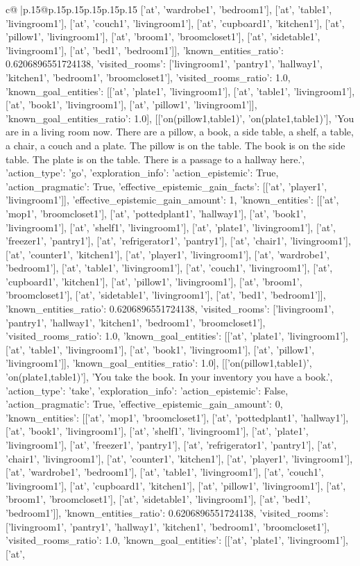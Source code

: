 \documentclass{article}
\begin{document}
{\begin{supertabular}{c@{$\;$}|p{.15\linewidth}@{}p{.15\linewidth}p{.15\linewidth}p{.15\linewidth}p{.15\linewidth}p{.15\linewidth}}
{{{['at', 'wardrobe1', 'bedroom1'], ['at', 'table1', 'livingroom1'], ['at', 'couch1', 'livingroom1'], ['at', 'cupboard1', 'kitchen1'], ['at', 'pillow1', 'livingroom1'], ['at', 'broom1', 'broomcloset1'], ['at', 'sidetable1', 'livingroom1'], ['at', 'bed1', 'bedroom1']], 'known_entities_ratio': 0.6206896551724138, 'visited_rooms': ['livingroom1', 'pantry1', 'hallway1', 'kitchen1', 'bedroom1', 'broomcloset1'], 'visited_rooms_ratio': 1.0, 'known_goal_entities': [['at', 'plate1', 'livingroom1'], ['at', 'table1', 'livingroom1'], ['at', 'book1', 'livingroom1'], ['at', 'pillow1', 'livingroom1']], 'known_goal_entities_ratio': 1.0}}], [['on(pillow1,table1)', 'on(plate1,table1)'], 'You are in a living room now. There are a pillow, a book, a side table, a shelf, a table, a chair, a couch and a plate. The pillow is on the table. The book is on the side table. The plate is on the table. There is a passage to a hallway here.', {'action_type': 'go', 'exploration_info': {'action_epistemic': True, 'action_pragmatic': True, 'effective_epistemic_gain_facts': [['at', 'player1', 'livingroom1']], 'effective_epistemic_gain_amount': 1, 'known_entities': [['at', 'mop1', 'broomcloset1'], ['at', 'pottedplant1', 'hallway1'], ['at', 'book1', 'livingroom1'], ['at', 'shelf1', 'livingroom1'], ['at', 'plate1', 'livingroom1'], ['at', 'freezer1', 'pantry1'], ['at', 'refrigerator1', 'pantry1'], ['at', 'chair1', 'livingroom1'], ['at', 'counter1', 'kitchen1'], ['at', 'player1', 'livingroom1'], ['at', 'wardrobe1', 'bedroom1'], ['at', 'table1', 'livingroom1'], ['at', 'couch1', 'livingroom1'], ['at', 'cupboard1', 'kitchen1'], ['at', 'pillow1', 'livingroom1'], ['at', 'broom1', 'broomcloset1'], ['at', 'sidetable1', 'livingroom1'], ['at', 'bed1', 'bedroom1']], 'known_entities_ratio': 0.6206896551724138, 'visited_rooms': ['livingroom1', 'pantry1', 'hallway1', 'kitchen1', 'bedroom1', 'broomcloset1'], 'visited_rooms_ratio': 1.0, 'known_goal_entities': [['at', 'plate1', 'livingroom1'], ['at', 'table1', 'livingroom1'], ['at', 'book1', 'livingroom1'], ['at', 'pillow1', 'livingroom1']], 'known_goal_entities_ratio': 1.0}}], [['on(pillow1,table1)', 'on(plate1,table1)'], 'You take the book. In your inventory you have a book.', {'action_type': 'take', 'exploration_info': {'action_epistemic': False, 'action_pragmatic': True, 'effective_epistemic_gain_amount': 0, 'known_entities': [['at', 'mop1', 'broomcloset1'], ['at', 'pottedplant1', 'hallway1'], ['at', 'book1', 'livingroom1'], ['at', 'shelf1', 'livingroom1'], ['at', 'plate1', 'livingroom1'], ['at', 'freezer1', 'pantry1'], ['at', 'refrigerator1', 'pantry1'], ['at', 'chair1', 'livingroom1'], ['at', 'counter1', 'kitchen1'], ['at', 'player1', 'livingroom1'], ['at', 'wardrobe1', 'bedroom1'], ['at', 'table1', 'livingroom1'], ['at', 'couch1', 'livingroom1'], ['at', 'cupboard1', 'kitchen1'], ['at', 'pillow1', 'livingroom1'], ['at', 'broom1', 'broomcloset1'], ['at', 'sidetable1', 'livingroom1'], ['at', 'bed1', 'bedroom1']], 'known_entities_ratio': 0.6206896551724138, 'visited_rooms': ['livingroom1', 'pantry1', 'hallway1', 'kitchen1', 'bedroom1', 'broomcloset1'], 'visited_rooms_ratio': 1.0, 'known_goal_entities': [['at', 'plate1', 'livingroom1'], ['at', }}}
\end{supertabular}}
\end{document}
